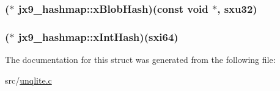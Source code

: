\hypertarget{structjx9__hashmap_ab6399de90da8cf5da1b492ef5929fc6d}{
\subsubsection[{x\-Blob\-Hash}]{($\ast$ jx9\-\_\-hashmap\-::x\-Blob\-Hash)(const void $\ast$, {\bf sxu32})}}\label{da/d5e/structjx9__hashmap_ab6399de90da8cf5da1b492ef5929fc6d}
\hypertarget{structjx9__hashmap_ae21a47f43f38dbc202f8ec521166d6ce}{
\subsubsection[{x\-Int\-Hash}]{($\ast$ jx9\-\_\-hashmap\-::x\-Int\-Hash)({\bf sxi64})}}\label{da/d5e/structjx9__hashmap_ae21a47f43f38dbc202f8ec521166d6ce}


The documentation for this struct was generated from the following file\-:\begin{DoxyCompactItemize}
\item 
src/\hyperlink{unqlite_8c}{unqlite.\-c}\end{DoxyCompactItemize}
